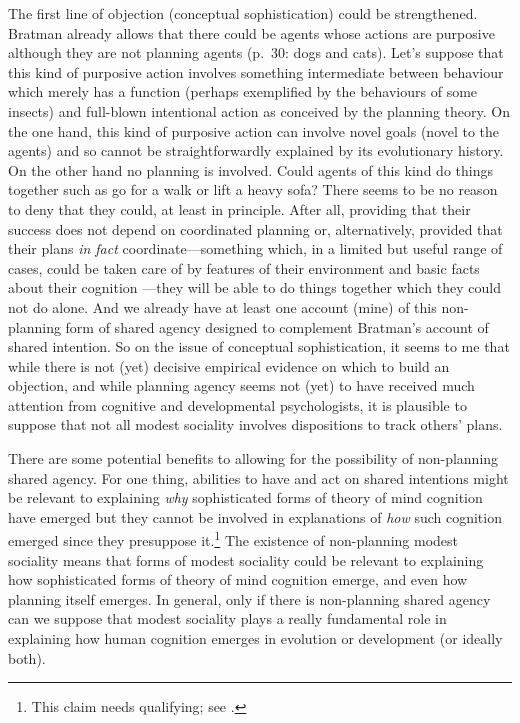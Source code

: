\documentclass[12pt,letterpaper]{extarticle}
\begin{document}
The first line of objection (conceptual sophistication) could be strengthened.
Bratman already allows that there could be agents whose actions are purposive although they are not planning agents (p.\ 30: dogs and cats).
Let's suppose that this kind of purposive action involves something intermediate between behaviour which merely has a function (perhaps exemplified by the behaviours of some insects) and full-blown intentional action as conceived by the planning theory.
On the one hand, this kind of purposive action can involve novel goals (novel to the agents) and so cannot be straightforwardly explained by its evolutionary history.
On the other hand no planning is involved.
Could agents of this kind do things together such as go for a walk or lift a heavy sofa?
There seems to be no reason to deny that they could, at least in principle.
After all, providing that their success does not depend on coordinated planning or, alternatively, provided that their plans \emph{in fact} coordinate---something which, in a limited but useful range of cases, could be taken care of by features of their environment and basic facts about their cognition \citep{richardson_judging_2007}---they will be able to do things together which they could not do alone.
And we already have at least one account (mine) of this non-planning form of shared agency designed to complement Bratman's account of shared intention.
So on the issue of conceptual sophistication, it seems to me that while there is not (yet) decisive empirical evidence on which to build an objection, and while planning agency seems not (yet) to have received much attention from cognitive and developmental psychologists, it is plausible to suppose that not all modest sociality involves dispositions to track others' plans.

There are some potential benefits to allowing for the possibility of non-planning shared agency.
For one thing, abilities to  have and act on shared intentions might be relevant to explaining \emph{why} sophisticated forms of theory of mind cognition have emerged but they cannot be involved in explanations of \emph{how} such cognition emerged since they presuppose it.\footnote{
This claim needs qualifying; see \citet{Butterfill:2011fk}.
}
The existence of non-planning modest sociality means that forms of modest sociality could be relevant to explaining how sophisticated forms of theory of mind cognition emerge, and even how planning itself emerges.
In general, only if there is non-planning shared agency can we suppose that modest sociality plays a really fundamental role in explaining how human cognition emerges in evolution or development (or ideally both).  
\end{document}
